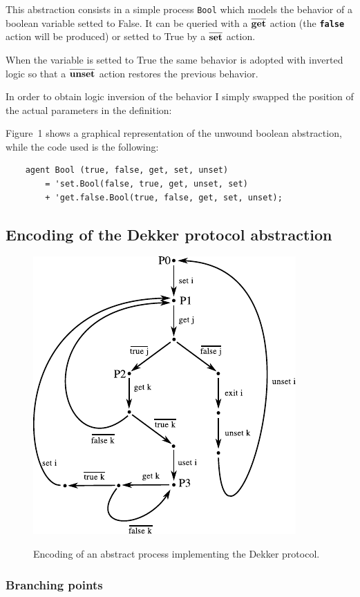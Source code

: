 \documentclass[10pt,a4paper]{article}
\newcommand{\Agent}[1]{{\tt {#1}}}
\newcommand{\Action}[1]{{\tt \bf {#1}}}
\newcommand{\CoAction}[1]{$\overline{\mbox{\Action{#1}}}$}
\begin{document}
        This abstraction consists in a simple process \Agent{Bool} which
        models the behavior of a boolean variable setted to False. It can
        be queried with a \CoAction{get} action (the \Action{false} action
        will be produced) or setted to True by a \CoAction{set} action.

        When the variable is setted to True the same behavior is adopted
        with inverted logic so that a \CoAction{unset} action restores the
        previous behavior.

        In order to obtain logic inversion of the behavior I simply
        swapped the position of the actual parameters in the definition:

        Figure~1 shows a graphical representation of the
        unwound boolean abstraction, while the code used is the
        following:
        \begin{verbatim}
    agent Bool (true, false, get, set, unset)
        = 'set.Bool(false, true, get, unset, set)
        + 'get.false.Bool(true, false, get, set, unset);
        \end{verbatim}

    \subsection{Encoding of the Dekker protocol abstraction}

        \begin{figure}[htbp]
            \centering
            \includegraphics[width=.5\textwidth]{pics/dekker}
            \label{pic:Dekker}
            \caption{
                Encoding of an abstract process implementing the Dekker
                protocol.
            }
        \end{figure}

        \subsubsection{Branching points}
        \label{subsub:BranchingPoints}
\end{document}
